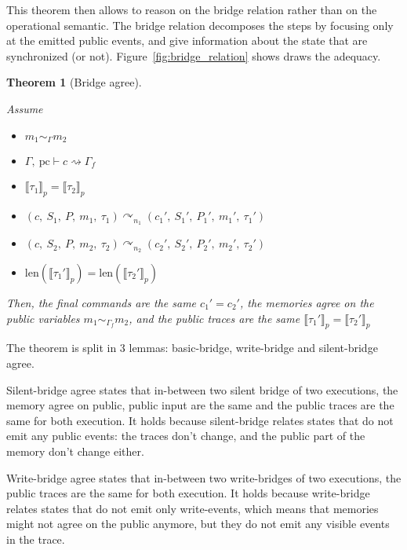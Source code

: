 \documentclass[10pt]{article}
\newcommand{\pc}{\mathrm{pc}}
\newcommand{\ctx}{\Gamma}
\newcommand{\typing}[4]{ #1,~#2 \vdash #3 \rightsquigarrow #4}
\newcommand{\bridge}[3] { #1 \curvearrowright_{#2} #3 }
\newcommand{\pproj}[1]{\llbracket #1 \rrbracket_{p}}
\newcommand{\agree}[3]{#2 \sim_{#1} #3}
\newtheorem{theorem}{Theorem}
\begin{document}
This theorem then allows to reason on the bridge relation rather than on the operational semantic.
The bridge relation decomposes the steps by focusing only at the emitted public events, and give
information about the state that are synchronized (or not).
Figure~\ref{fig:bridge_relation} shows draws the adequacy.




\begin{theorem}[Bridge agree]\label{thm:agree}

  Assume
  \begin{itemize}
    \item $\agree{\ctx}{m_{1}}{m_{2}}$
    \item $\typing{\ctx}{\pc}{c}{\ctx_{f}}$
    \item $\pproj{\tau_{1}} = \pproj{\tau_{2}}$
    \item $\bridge{(c,~S_{1},~P,~m_{1},~\tau_{1})}{n_{1}}(c_{1}',~S_{1}',~P_{1}',~m_{1}',~\tau_{1}')$
    \item $\bridge{(c,~S_{2},~P,~m_{2},~\tau_{2})}{n_{2}}(c_{2}',~S_{2}',~P_{2}',~m_{2}',~\tau_{2}')$
    \item $\mathrm{len}(\pproj{\tau_{1}'}) = \mathrm{len}(\pproj{\tau_{2}'})$
  \end{itemize}

  Then,
  the final commands are the same $c_{1}' = c_{2}'$,
  the memories agree on the public variables $\agree{\ctx_{f}}{m_{1}}{m_{2}}$, %
  and the public traces are the same $\pproj{\tau_{1}'} = \pproj{\tau_{2}'}$
\end{theorem}

The theorem is split in 3 lemmas: basic-bridge, write-bridge and silent-bridge agree.

Silent-bridge agree states that in-between two silent bridge of two executions,
the memory agree on public, public input are the same and the public
traces are the same for both execution. It holds because silent-bridge relates states that do not
emit any public events: the traces don't change, and the public part of the memory don't change
either.

Write-bridge agree states that in-between two write-bridges of two executions,
the public traces are the same for both execution. It holds because write-bridge relates states that
do not emit only write-events, which means that memories might not agree on the public anymore, but
they do not emit any visible events in the trace.
\end{document}
